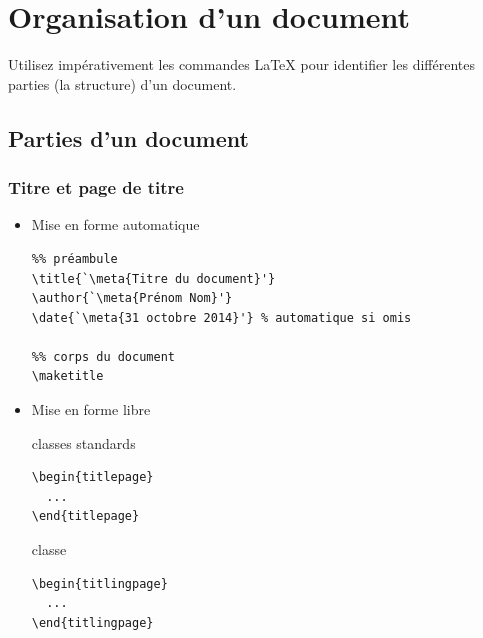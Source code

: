 \section{Organisation d'un document}

\begin{frame}[standout]
  \begin{conseil}
    Utilisez impérativement les commandes {\LaTeX} pour identifier
    les différentes parties (la structure) d'un document.
  \end{conseil}
\end{frame}

\subsection{Parties d'un document}

\begin{frame}[fragile]
  \frametitle{Titre et page de titre}
  \begin{itemize}
  \item Mise en forme automatique
    \begin{lstlisting}
%% préambule
\title{`\meta{Titre du document}'}
\author{`\meta{Prénom Nom}'}
\date{`\meta{31 octobre 2014}'} % automatique si omis

%% corps du document
\maketitle
    \end{lstlisting}
  \item Mise en forme libre \\[6pt]
    \begin{minipage}{0.45\linewidth}
      \begin{block}{\small classes standards}
\begin{lstlisting}
\begin{titlepage}
  ...
\end{titlepage}
\end{lstlisting}
      \end{block}
    \end{minipage}
    \hfill
    \begin{minipage}{0.45\linewidth}
      \begin{block}{\small classe }
\begin{lstlisting}
\begin{titlingpage}
  ...
\end{titlingpage}
\end{lstlisting}
      \end{block}
    \end{minipage}
  \end{itemize}
\end{frame}

